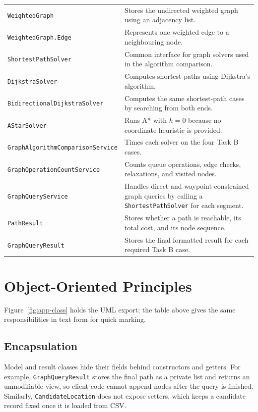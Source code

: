 \documentclass[12pt,a4paper,twocolumn,openany]{report}
\begin{document}
\begin{table}[t]
\begin{tabularx}{\textwidth}{@{}p{3.6cm}X@{}}
\texttt{WeightedGraph} & Stores the undirected weighted graph using an adjacency list. \\
\texttt{WeightedGraph.Edge} & Represents one weighted edge to a neighbouring node. \\
\texttt{ShortestPathSolver} & Common interface for graph solvers used in the algorithm comparison. \\
\texttt{DijkstraSolver} & Computes shortest paths using Dijkstra's algorithm. \\
\texttt{BidirectionalDijkstraSolver} & Computes the same shortest-path cases by searching from both ends. \\
\texttt{AStarSolver} & Runs A* with $h=0$ because no coordinate heuristic is provided. \\
\texttt{GraphAlgorithmComparisonService} & Times each solver on the four Task B cases. \\
\texttt{GraphOperationCountService} & Counts queue operations, edge checks, relaxations, and visited nodes. \\
\texttt{GraphQueryService} & Handles direct and waypoint-constrained graph queries by calling a \texttt{ShortestPathSolver} for each segment. \\
\texttt{PathResult} & Stores whether a path is reachable, its total cost, and its node sequence. \\
\texttt{GraphQueryResult} & Stores the final formatted result for each required Task B case. \\
\bottomrule
\end{tabularx}
\end{table}

\section{Object-Oriented Principles}
Figure~\ref{fig:app-class} holds the UML export; the table above gives the same responsibilities in text form for quick marking.

\subsection{Encapsulation}
Model and result classes hide their fields behind constructors and getters. 
For example, \texttt{GraphQueryResult} stores the final path as a private list and returns an unmodifiable view, so client code cannot append nodes after the query is finished. 
Similarly, \texttt{CandidateLocation} does not expose setters, which keeps a candidate record fixed once it is loaded from CSV.
\end{document}
